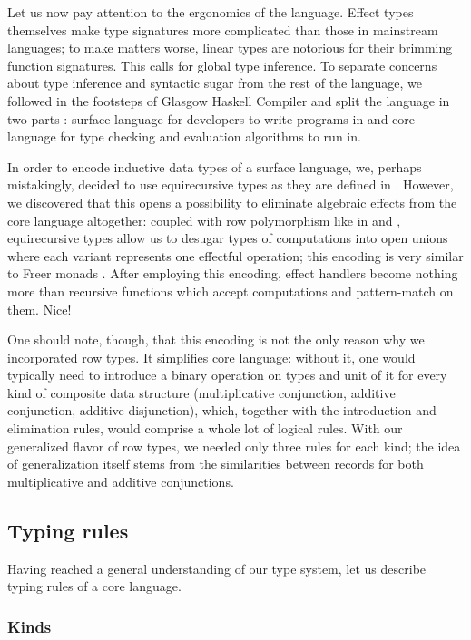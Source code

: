 \documentclass[conference]{IEEEtran}
\begin{document}
Let us now pay attention to the ergonomics of the language. Effect types
themselves make type signatures more complicated than those in mainstream
languages; to make matters worse, linear types are notorious for their brimming
function signatures. This calls for global type inference. To separate concerns
about type inference and syntactic sugar from the rest of the language, we
followed in the footsteps of Glasgow Haskell Compiler and split the language in
two parts \cite{ghc}: surface language for developers to write programs in and
core language for type checking and evaluation algorithms to run in.

In order to encode inductive data types of a surface language, we, perhaps
mistakingly, decided to use equirecursive types as they are defined in
\cite{stone}. However, we discovered that this opens a possibility to eliminate
algebraic effects from the core language altogether: coupled with row
polymorphism like in \cite{rowkoka} and \cite{rowcaml}, equirecursive types
allow us to desugar types of computations into open unions where each variant
represents one effectful operation; this encoding is very similar to Freer
monads \cite{exteff}. After employing this encoding, effect handlers become
nothing more than recursive functions which accept computations and
pattern-match on them. Nice!

One should note, though, that this encoding is not the only reason why we
incorporated row types. It simplifies core language: without it, one would
typically need to introduce a binary operation on types and unit of it for every
kind of composite data structure (multiplicative conjunction, additive
conjunction, additive disjunction), which, together with the introduction and
elimination rules, would comprise a whole lot of logical rules. With our
generalized flavor of row types, we needed only three rules for each kind; the
idea of generalization itself stems from the similarities between records for
both multiplicative and additive conjunctions.

\subsection{Typing rules}

Having reached a general understanding of our type system, let us describe
typing rules of a core language.

\subsubsection{Kinds}
\end{document}
